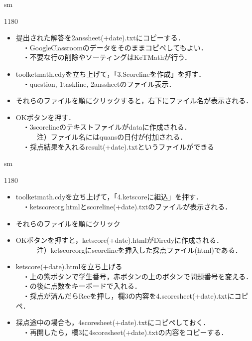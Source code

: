 \documentclass[landscape,10pt]{ujarticle}
\newcommand{\slidepage}[1][s]{%
\setcounter{ketpicctra}{18}%
\if#1m \setcounter{ketpicctra}{1}\fi
\hypersetup{linkcolor=black}%

\begin{layer}{118}{0}
\putnotee{122}{-\theketpicctra.05}{\small\thepage/\pageref{pageend}}
\end{layer}\hypersetup{linkcolor=blue}

}
\begin{document}

\vspace*{18mm}

\slidepage
\begin{itemize}
\item
提出された解答を2anssheet(+date).txtにコピーする．\\
　・GoogleClassroomのデータをそのままコピペしてもよい．\\
　・不要な行の削除やソーティングはKeTMathが行う．
\item
toolketmath.cdyを立ち上げて，「3.Scorelineを作成」を押す．\\
　・question, 1taskline, 2anssheetのファイル表示．
\item
それらのファイルを順にクリックすると，右下にファイル名が表示される．
\item
OKボタンを押す．\\
　・3scorelineのテキストファイルがdataに作成される．\\
　　　注）ファイル名にはquansの日付が付加される．\\
　・採点結果を入れるresult(+date).txtというファイルができる
\end{itemize}



\vspace*{18mm}

\slidepage
\begin{itemize}
\item
toolketmath.cdyを立ち上げて，「4.ketscoreに組込」を押す．\\
　・ketscoreorg.htmlとscoreline(+date).txtのファイルが表示される．
\item
それらのファイルを順にクリック
\item
OKボタンを押すと，ketscore(+date).htmlがDircdyに作成される．\\
　　　注）ketscoreorgにscorelineを挿入した採点ファイル(html)である．
\item
ketscore(+date).htmlを立ち上げる\\
　・上の紫ボタンで学生番号，赤ボタンの上のボタンで問題番号を変える．\\
　・\dc の後に点数をキーボードで入れる．\\
　・採点が済んだらRecを押し，欄3の内容を4.scoresheet(+date).txtにコピペ．
\item
採点途中の場合も，4scoresheet(+date).txtにコピペしておく．\\
　・再開したら，欄3に4scoresheet(+date).txtの内容をコピーする．
\end{itemize}
\end{document}
